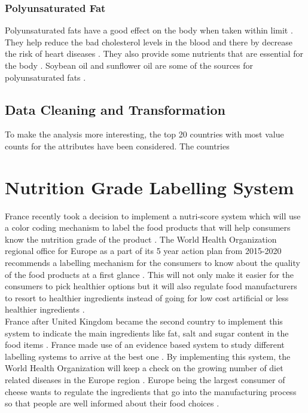 \documentclass[sigconf]{acmart}
\begin{document}
\subsubsection{Polyunsaturated Fat}
Polyunsaturated fats have a good effect on the body when taken within limit \cite{www-health}. They help reduce the bad cholesterol levels in the blood and there by decrease the risk of heart diseases \cite{www-health}. They also provide some nutrients that are essential for the body \cite{www-health}. Soybean oil and sunflower oil are some of the sources for polyunsaturated fats \cite{www-health}.

\subsection{Data Cleaning and Transformation}
To make the analysis more interesting, the top 20 countries with most value counts for the attributes have been considered. The countries 
\section{Nutrition Grade Labelling System}
France recently took a decision to implement a nutri-score system which will use a color coding mechanism to label the food products that will help consumers know the nutrition grade of the product \cite{www-who}. The World Health Organization regional office for Europe as a part of its 5 year action plan from 2015-2020 recommends a labelling mechanism for the consumers to know about the quality of the food products at a first glance \cite{www-who}. This will not only make it easier for the consumers to pick healthier options but it will also regulate food manufacturers to resort to healthier ingredients instead of going for low cost artificial or less healthier ingredients \cite{www-who}.  \\

France after United Kingdom became the second country to implement this system to indicate the main ingredients like fat, salt and sugar content in the food items \cite{www-who}. France made use of an evidence based system to study different labelling systems to arrive at the best one \cite{www-who}. By implementing this system, the World Health Organization will keep a check on the growing number of diet related diseases in the Europe region \cite{www-who}. Europe being the largest consumer of cheese wants to regulate the ingredients that go into the manufacturing process so that people are well informed about their food choices \cite{www-who}.
\end{document}
